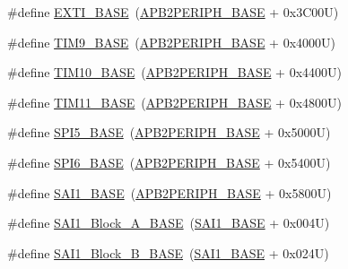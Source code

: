 \begin{DoxyCompactItemize}
\item 
\#define \hyperlink{group___peripheral__memory__map_ga87371508b3bcdcd98cd1ec629be29061}{E\+X\+T\+I\+\_\+\+B\+A\+SE}~(\hyperlink{group___peripheral__memory__map_ga25b99d6065f1c8f751e78f43ade652cb}{A\+P\+B2\+P\+E\+R\+I\+P\+H\+\_\+\+B\+A\+SE} + 0x3\+C00\+U)
\item 
\#define \hyperlink{group___peripheral__memory__map_ga92ae902be7902560939223dd765ece08}{T\+I\+M9\+\_\+\+B\+A\+SE}~(\hyperlink{group___peripheral__memory__map_ga25b99d6065f1c8f751e78f43ade652cb}{A\+P\+B2\+P\+E\+R\+I\+P\+H\+\_\+\+B\+A\+SE} + 0x4000\+U)
\item 
\#define \hyperlink{group___peripheral__memory__map_ga3eff32f3801db31fb4b61d5618cad54a}{T\+I\+M10\+\_\+\+B\+A\+SE}~(\hyperlink{group___peripheral__memory__map_ga25b99d6065f1c8f751e78f43ade652cb}{A\+P\+B2\+P\+E\+R\+I\+P\+H\+\_\+\+B\+A\+SE} + 0x4400\+U)
\item 
\#define \hyperlink{group___peripheral__memory__map_ga3a4a06bb84c703084f0509e105ffaf1d}{T\+I\+M11\+\_\+\+B\+A\+SE}~(\hyperlink{group___peripheral__memory__map_ga25b99d6065f1c8f751e78f43ade652cb}{A\+P\+B2\+P\+E\+R\+I\+P\+H\+\_\+\+B\+A\+SE} + 0x4800\+U)
\item 
\#define \hyperlink{group___peripheral__memory__map_gac1c58d33414e167d478ecd0e31331dfa}{S\+P\+I5\+\_\+\+B\+A\+SE}~(\hyperlink{group___peripheral__memory__map_ga25b99d6065f1c8f751e78f43ade652cb}{A\+P\+B2\+P\+E\+R\+I\+P\+H\+\_\+\+B\+A\+SE} + 0x5000\+U)
\item 
\#define \hyperlink{group___peripheral__memory__map_gaf69c602bd348dc0aa1b4e829e40ebb70}{S\+P\+I6\+\_\+\+B\+A\+SE}~(\hyperlink{group___peripheral__memory__map_ga25b99d6065f1c8f751e78f43ade652cb}{A\+P\+B2\+P\+E\+R\+I\+P\+H\+\_\+\+B\+A\+SE} + 0x5400\+U)
\item 
\#define \hyperlink{group___peripheral__memory__map_ga24c1053b754946b512f9c31123e09d21}{S\+A\+I1\+\_\+\+B\+A\+SE}~(\hyperlink{group___peripheral__memory__map_ga25b99d6065f1c8f751e78f43ade652cb}{A\+P\+B2\+P\+E\+R\+I\+P\+H\+\_\+\+B\+A\+SE} + 0x5800\+U)
\item 
\#define \hyperlink{group___peripheral__memory__map_ga31f72e5e5d7aea23bc8a5191bc32e900}{S\+A\+I1\+\_\+\+Block\+\_\+\+A\+\_\+\+B\+A\+SE}~(\hyperlink{group___peripheral__memory__map_ga24c1053b754946b512f9c31123e09d21}{S\+A\+I1\+\_\+\+B\+A\+SE} + 0x004\+U)
\item 
\#define \hyperlink{group___peripheral__memory__map_gacdb59b321830def8c7a57c154178bc48}{S\+A\+I1\+\_\+\+Block\+\_\+\+B\+\_\+\+B\+A\+SE}~(\hyperlink{group___peripheral__memory__map_ga24c1053b754946b512f9c31123e09d21}{S\+A\+I1\+\_\+\+B\+A\+SE} + 0x024\+U)

\end{DoxyCompactItemize}
